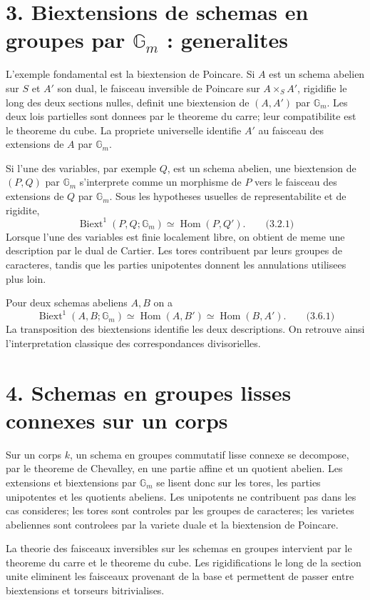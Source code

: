 \documentclass[11pt]{article}
\providecommand{\Gm}{\mathbb G_m}
\providecommand{\Hom}{\operatorname{Hom}}
\providecommand{\Biext}{\operatorname{Biext}}
\providecommand{\Hom}{\operatorname{Hom}}
\providecommand{\Gm}{\mathbb G_m}
\begin{document}
\section*{3. Biextensions de schemas en groupes par \(\Gm\) : generalites}

L'exemple fondamental est la biextension de Poincare.  Si \(A\) est un schema abelien sur \(S\) et \(A'\) son dual, le faisceau inversible de Poincare sur \(A\times_S A'\), rigidifie le long des deux sections nulles, definit une biextension de \((A,A')\) par \(\Gm\).  Les deux lois partielles sont donnees par le theoreme du carre; leur compatibilite est le theoreme du cube.  La propriete universelle identifie \(A'\) au faisceau des extensions de \(A\) par \(\Gm\).

Si l'une des variables, par exemple \(Q\), est un schema abelien, une biextension de \((P,Q)\) par \(\Gm\) s'interprete comme un morphisme de \(P\) vers le faisceau des extensions de \(Q\) par \(\Gm\).  Sous les hypotheses usuelles de representabilite et de rigidite,
\[
        \Biext^1(P,Q;\Gm)\simeq \Hom(P,Q').
\qquad\text{(3.2.1)}
\]
Lorsque l'une des variables est finie localement libre, on obtient de meme une description par le dual de Cartier.  Les tores contribuent par leurs groupes de caracteres, tandis que les parties unipotentes donnent les annulations utilisees plus loin.

Pour deux schemas abeliens \(A,B\) on a
\[
        \Biext^1(A,B;\Gm)\simeq \Hom(A,B')\simeq \Hom(B,A').
\qquad\text{(3.6.1)}
\]
La transposition des biextensions identifie les deux descriptions.  On retrouve ainsi l'interpretation classique des correspondances divisorielles.

\section*{4. Schemas en groupes lisses connexes sur un corps}

Sur un corps \(k\), un schema en groupes commutatif lisse connexe se decompose, par le theoreme de Chevalley, en une partie affine et un quotient abelien.  Les extensions et biextensions par \(\Gm\) se lisent donc sur les tores, les parties unipotentes et les quotients abeliens.  Les unipotents ne contribuent pas dans les cas consideres; les tores sont controles par les groupes de caracteres; les varietes abeliennes sont controlees par la variete duale et la biextension de Poincare.

La theorie des faisceaux inversibles sur les schemas en groupes intervient par le theoreme du carre et le theoreme du cube.  Les rigidifications le long de la section unite eliminent les faisceaux provenant de la base et permettent de passer entre biextensions et torseurs bitrivialises.
\end{document}
